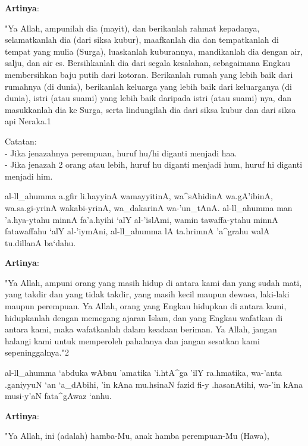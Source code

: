 \documentclass[a4paper,12pt]{article}
\begin{document}
\noindent
\textbf{Artinya}:
\par
\indent
"Ya Allah, ampunilah dia (mayit), dan berikanlah rahmat kepadanya, 
selamatkanlah dia (dari siksa kubur), maafkanlah dia dan tempatkanlah di 
tempat yang mulia (Surga), luaskanlah kuburannya, mandikanlah dia dengan 
air, salju, dan air es. Bersihkanlah dia dari segala kesalahan, sebagaimana
Engkau membersihkan baju putih dari kotoran. Berikanlah rumah yang lebih 
baik dari rumahnya (di dunia), berikanlah keluarga yang lebih baik dari 
keluarganya (di dunia), istri (atau suami) yang lebih baik daripada istri 
(atau suami) nya, dan masukkanlah dia ke Surga, serta lindungilah dia dari 
siksa kubur dan dari siksa api Neraka.{\scriptsize 1}
\begin{shaded*}
\noindent
Catatan:\\
- Jika jenazahnya perempuan, huruf hu/hi diganti menjadi haa.\\
- Jika jenazah 2 orang atau lebih, huruf hu diganti menjadi hum, huruf hi 
diganti menjadi him.
\end{shaded*}
\begin{arabtext}
\noindent
al-ll_ahumma a.gfir li.hayyinA wamayyitinA, wa^sAhidinA wa.gA'ibinA, 
wa.sa.gi-yrinA wakabi-yrinA, wa_dakarinA wa-'un_tAnA. al-ll_ahumma man 
'a.hya-ytahu minnA fa'a.hyihi `alY al-'islAmi, wamin tawaffa-ytahu minnA 
fatawaffahu `alY al-'iymAni, al-ll_ahumma lA ta.hrimnA 'a^grahu walA 
tu.dillanA ba`dahu.\\
\end{arabtext}
\noindent
\textbf{Artinya}:
\par
\indent
"Ya Allah, ampuni orang yang masih hidup di antara kami dan yang sudah 
mati, yang takdir dan yang tidak takdir, yang masih kecil maupun dewasa, 
laki-laki maupun perempuan. Ya Allah, orang yang Engkau hidupkan di antara 
kami, hidupkanlah dengan memegang ajaran Islam, dan yang Engkau wafatkan di
antara kami, maka wafatkanlah dalam keadaan beriman. Ya Allah, jangan 
halangi kami untuk memperoleh pahalanya dan jangan sesatkan kami 
sepeninggalnya."{\scriptsize 2}\\
\begin{arabtext}
\noindent
al-ll_ahumma `abduka wAbnu 'amatika 'i.htA^ga 'ilY ra.hmatika, wa-'anta 
.ganiyyuN `an `a_dAbihi, 'in kAna mu.hsinaN fazid fi-y .hasanAtihi, wa-'in 
kAna musi-y'aN fata^gAwaz `anhu.\\
\end{arabtext}
\noindent
\textbf{Artinya}:
\par
\indent
"Ya Allah, ini (adalah) hamba-Mu, anak hamba perempuan-Mu (Hawa), 
\end{document}

